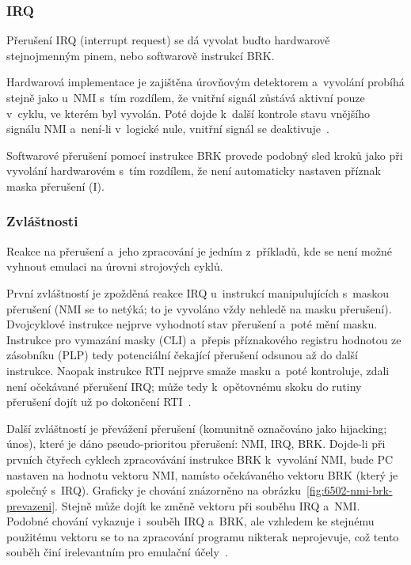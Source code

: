 \subsubsection*{IRQ}
Přerušení IRQ (interrupt request) se dá vyvolat buďto hardwarově stejnojmenným pinem, nebo softwarově instrukcí BRK.

Hardwarová implementace je zajištěna úrovňovým detektorem a~vyvolání probíhá stejně jako u~NMI s~tím rozdílem, že vnitřní signál zůstává aktivní pouze v~cyklu, ve kterém byl vyvolán. Poté dojde k~další kontrole stavu vnějšího signálu NMI a~není-li v~logické nule, vnitřní signál se deaktivuje~\cite{Nesdev:cpu-interrupts}.

Softwarové přerušení pomocí instrukce BRK provede podobný sled kroků jako při vyvolání hardwarovém s~tím rozdílem, že není automaticky nastaven příznak maska přerušení (I).

\subsubsection*{Zvláštnosti}
Reakce na přerušení a~jeho zpracování je jedním z~příkladů, kde se není možné vyhnout emulaci na úrovni strojových cyklů.

První zvláštností je zpožděná reakce IRQ u~instrukcí manipulujících s~maskou přerušení (NMI se to netýká; to je vyvoláno vždy nehledě na masku přerušení). Dvojcyklové instrukce nejprve vyhodnotí stav přerušení a~poté mění masku. Instrukce pro vymazání masky (CLI) a~přepis příznakového registru hodnotou ze zásobníku (PLP) tedy potenciální čekající přerušení odsunou až do další instrukce. Naopak instrukce RTI nejprve smaže masku a~poté kontroluje, zdali není očekávané přerušení IRQ; může tedy k~opětovnému skoku do rutiny přerušení dojít už po dokončení RTI~\cite{Nesdev:cpu-interrupts}.

Další zvláštností je převážení přerušení (komunitně označováno jako hijacking; únos), které je dáno pseudo-prioritou přerušení: NMI, IRQ, BRK. Dojde-li při prvních čtyřech cyklech zpracovávání instrukce BRK k~vyvolání NMI, bude PC nastaven na hodnotu vektoru NMI, namísto očekávaného vektoru BRK (který je společný s~IRQ). Graficky je chování znázorněno na obrázku~\ref{fig:6502-nmi-brk-prevazeni}. Stejně může dojít ke změně vektoru při souběhu IRQ a~NMI. Podobné chování vykazuje i~souběh IRQ a~BRK, ale vzhledem ke stejnému použitému vektoru se to na zpracování programu nikterak neprojevuje, což tento souběh činí irelevantním pro emulační účely~\cite{Nesdev:cpu-interrupts}.


